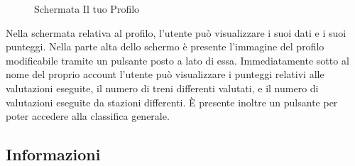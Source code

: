 \begin{figure}[htp]
    \caption{Schermata Il tuo Profilo}
    \label{fig:ilTuoProfilo}
\end{figure}

Nella schermata relativa al profilo, l'utente può visualizzare i suoi dati e i suoi punteggi. Nella parte alta dello schermo è presente l'immagine del profilo modificabile tramite un pulsante posto a lato di essa. Immediatamente sotto al nome del proprio account l'utente può visualizzare i punteggi relativi alle valutazioni eseguite, il numero di treni differenti valutati, e il numero di valutazioni eseguite da stazioni differenti. È presente inoltre un pulsante per poter accedere alla classifica generale.

\subsection{Informazioni}

